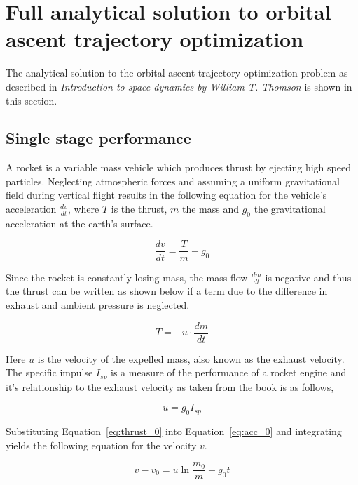 \chapter{Full analytical solution to orbital ascent trajectory optimization}
\label{chp:full_analytical_solution}
The analytical solution to the orbital ascent trajectory optimization problem as described in \emph{Introduction to space dynamics by William T. Thomson} \cite{thomson2012introduction} is shown in this section.

\section{Single stage performance}
A rocket is a variable mass vehicle which produces thrust by ejecting high speed particles. Neglecting atmospheric forces and assuming a uniform gravitational field during vertical flight results in the following equation for the vehicle's acceleration $\frac{dv}{dt}$, where $T$ is the thrust, $m$ the mass and $g_{0}$ the gravitational acceleration at the earth's surface.

\begin{equation}
    \label{eq:acc_0}
    \frac{dv}{dt} = \frac{T}{m} - g_{0}
\end{equation}

Since the rocket is constantly losing mass, the mass flow $\frac{dm}{dt}$ is negative and thus the thrust can be written as shown below if a term due to the difference in exhaust and ambient pressure is neglected.

\begin{equation}
    \label{eq:thrust_0}
    T = -u \cdot \frac{dm}{dt}
\end{equation}

Here $u$ is the velocity of the expelled mass, also known as the exhaust velocity. The specific impulse $I_{sp}$ is a measure of the performance of a rocket engine and it's relationship to the exhaust velocity as taken from the book \cite{thomson2012introduction} is as follows,

\begin{equation}
    \label{eg:isp_0}
    u=g_0I_{sp}
\end{equation}

Substituting Equation~\eqref{eq:thrust_0} into Equation~\eqref{eq:acc_0} and integrating yields the following equation for the velocity $v$.

\begin{equation}
    \label{eq:vel_0}
    v - v_0 = u \ln{\frac{m_0}{m}} - g_{0}t
\end{equation}

